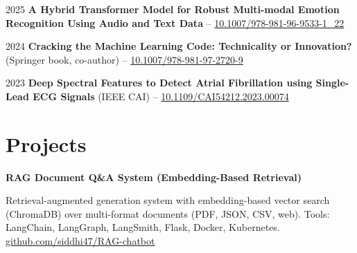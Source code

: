         \begin{samepage}
            \begin{twocolentry}{
                2025
            }
                \textbf{A Hybrid Transformer Model for Robust Multi-modal Emotion Recognition Using Audio and Text Data} -- \href{https://link.springer.com/chapter/10.1007/978-981-96-9533-1_22}{10.1007/978-981-96-9533-1\_22}
            \end{twocolentry}
        \end{samepage}

        \vspace{0.06 cm}
        \begin{samepage}
            \begin{twocolentry}{
                2024
            }
                \textbf{Cracking the Machine Learning Code: Technicality or Innovation?} (Springer book, co-author) -- \href{https://doi.org/10.1007/978-981-97-2720-9}{10.1007/978-981-97-2720-9}
            \end{twocolentry}
        \end{samepage}

        \vspace{0.06 cm}
        \begin{samepage}
            \begin{twocolentry}{
                2023
            }
                \textbf{Deep Spectral Features to Detect Atrial Fibrillation using Single-Lead ECG Signals} (IEEE CAI) -- \href{https://ieeexplore.ieee.org/document/10195073}{10.1109/CAI54212.2023.00074}
            \end{twocolentry}
        \end{samepage}

    \section{Projects}

        \begin{twocolentry}{
        }
            \textbf{RAG Document Q\&A System (Embedding-Based Retrieval)}\end{twocolentry}
        \vspace{0.06 cm}
        \begin{onecolentry}
            \begin{highlights}
                \item Retrieval-augmented generation system with embedding-based vector search (ChromaDB) over multi-format documents (PDF, JSON, CSV, web). Tools: LangChain, LangGraph, LangSmith, Flask, Docker, Kubernetes. \href{https://github.com/siddhi47/RAG-chatbot}{github.com/siddhi47/RAG-chatbot}
            \end{highlights}
        \end{onecolentry}

